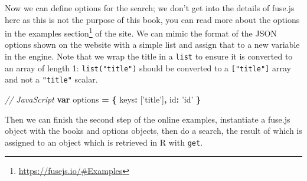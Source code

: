 \documentclass[10pt,]{krantz}
\makeatletter
\newenvironment{Shaded}{\begin{snugshade}}{\end{snugshade}}
\newcommand{\CommentTok}[1]{\textcolor[rgb]{0.37,0.37,0.37}{\textit{#1}}}
\newcommand{\DataTypeTok}[1]{\textcolor[rgb]{0.27,0.27,0.27}{#1}}
\newcommand{\KeywordTok}[1]{\textcolor[rgb]{0.27,0.27,0.27}{\textbf{#1}}}
\newcommand{\NormalTok}[1]{#1}
\newcommand{\OperatorTok}[1]{\textcolor[rgb]{0.43,0.43,0.43}{\textbf{#1}}}
\newcommand{\StringTok}[1]{\textcolor[rgb]{0.5,0.5,0.5}{#1}}
\renewcommand{\href}[2]{#2\footnote{\url{#1}}}
\newenvironment{kframe}{%
\medskip{}
\setlength{\fboxsep}{.8em}
 \def\at@end@of@kframe{}%
 \ifinner\ifhmode%
  \def\at@end@of@kframe{\end{minipage}}%
  \begin{minipage}{\columnwidth}%
 \fi\fi%
 \def\FrameCommand##1{\hskip\@totalleftmargin \hskip-\fboxsep
 \colorbox{shadecolor}{##1}\hskip-\fboxsep
     \hskip-\linewidth \hskip-\@totalleftmargin \hskip\columnwidth}%
 \MakeFramed {\advance\hsize-\width
   \@totalleftmargin\z@ \linewidth\hsize
   \@setminipage}}%
 {\par\unskip\endMakeFramed%
 \at@end@of@kframe}
\renewenvironment{Shaded}{\begin{kframe}}{\end{kframe}}
\makeatother
\begin{document}
Now we can define options for the search; we don't get into the details of fuse.js here as this is not the purpose of this book, you can read more about the options in the \href{https://fusejs.io/\#Examples}{examples section} of the site. We can mimic the format of the JSON options shown on the website with a simple list and assign that to a new variable in the engine. Note that we wrap the title in a \texttt{list} to ensure it is converted to an array of length 1: \texttt{list("title")} should be converted to a \texttt{{[}"title"{]}} array and not a \texttt{"title"} scalar.

\begin{Shaded}
\begin{Highlighting}[]
\CommentTok{// JavaScript}
\KeywordTok{var}\NormalTok{ options }\OperatorTok{=} \OperatorTok{\{}
  \DataTypeTok{keys}\OperatorTok{:}\NormalTok{ [}\StringTok{'title'}\NormalTok{]}\OperatorTok{,}
  \DataTypeTok{id}\OperatorTok{:} \StringTok{'id'}
\OperatorTok{\}}
\end{Highlighting}
\end{Shaded}

\begin{Shaded}
\end{Shaded}

Then we can finish the second step of the online examples, instantiate a fuse.js object with the books and options objects, then do a search, the result of which is assigned to an object which is retrieved in R with \texttt{get}.

\begin{Shaded}
\end{Shaded}
\end{document}
